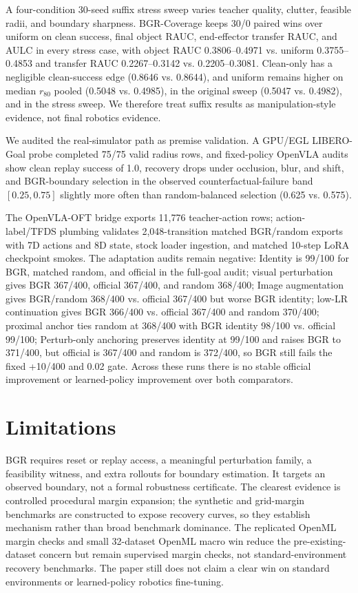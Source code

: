 \documentclass[letterpaper]{article}
\begin{document}
A four-condition 30-seed suffix stress sweep varies teacher quality, clutter, feasible radii, and boundary sharpness. BGR-Coverage keeps 30/0 paired wins over uniform on clean success, final object RAUC, end-effector transfer RAUC, and AULC in every stress case, with object RAUC 0.3806--0.4971 vs. uniform 0.3755--0.4853 and transfer RAUC 0.2267--0.3142 vs. 0.2205--0.3081. Clean-only has a negligible clean-success edge (0.8646 vs. 0.8644), and uniform remains higher on median $r_{80}$ pooled (0.5048 vs. 0.4985), in the original sweep (0.5047 vs. 0.4982), and in the stress sweep. We therefore treat suffix results as manipulation-style evidence, not final robotics evidence.

We audited the real-simulator path as premise validation. A GPU/EGL LIBERO-Goal probe completed 75/75 valid radius rows, and fixed-policy OpenVLA audits show clean replay success of 1.0, recovery drops under occlusion, blur, and shift, and BGR-boundary selection in the observed counterfactual-failure band $[0.25,0.75]$ slightly more often than random-balanced selection (0.625 vs. 0.575).

The OpenVLA-OFT bridge exports 11,776 teacher-action rows; action-label/TFDS plumbing validates 2,048-transition matched BGR/random exports with 7D actions and 8D state, stock loader ingestion, and matched 10-step LoRA checkpoint smokes. The adaptation audits remain negative: Identity is 99/100 for BGR, matched random, and official in the full-goal audit; visual perturbation gives BGR 367/400, official 367/400, and random 368/400; Image augmentation gives BGR/random 368/400 vs. official 367/400 but worse BGR identity; low-LR continuation gives BGR 366/400 vs. official 367/400 and random 370/400; proximal anchor ties random at 368/400 with BGR identity 98/100 vs. official 99/100; Perturb-only anchoring preserves identity at 99/100 and raises BGR to 371/400, but official is 367/400 and random is 372/400, so BGR still fails the fixed +10/400 and 0.02 gate. Across these runs there is no stable official improvement or learned-policy improvement over both comparators.

\section{Limitations}

BGR requires reset or replay access, a meaningful perturbation family, a feasibility witness, and extra rollouts for boundary estimation. It targets an observed boundary, not a formal robustness certificate. The clearest evidence is controlled procedural margin expansion; the synthetic and grid-margin benchmarks are constructed to expose recovery curves, so they establish mechanism rather than broad benchmark dominance. The replicated OpenML margin checks and small 32-dataset OpenML macro win reduce the pre-existing-dataset concern but remain supervised margin checks, not standard-environment recovery benchmarks. The paper still does not claim a clear win on standard environments or learned-policy robotics fine-tuning.
\end{document}
